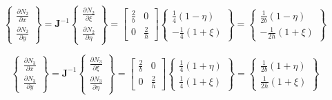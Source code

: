     \begin{equation}
        \begin{Bmatrix}
            \frac{\partial N_2}{\partial x} \\
            \frac{\partial N_2}{\partial y}
        \end{Bmatrix} = 
        \mathbf{J}^{-1}
        \begin{Bmatrix}
            \frac{\partial N_2}{\partial \xi} \\
            \frac{\partial N_2}{\partial \eta}
        \end{Bmatrix}=
        \begin{bmatrix}
                \frac{2}{b} &  0\\
                0 &  \frac{2}{h}
        \end{bmatrix}
        \begin{Bmatrix}
            \frac{1}{4}\left(1-\eta\right) \\
            -\frac{1}{4}\left(1+\xi\right)
        \end{Bmatrix}=
        \begin{Bmatrix}
            \frac{1}{2b}\left(1-\eta\right) \\
            -\frac{1}{2h}\left(1+\xi\right)
        \end{Bmatrix}
    \end{equation}

    \begin{equation}
        \begin{Bmatrix}
            \frac{\partial N_3}{\partial x} \\
            \frac{\partial N_3}{\partial y}
        \end{Bmatrix} = 
        \mathbf{J}^{-1}
        \begin{Bmatrix}
            \frac{\partial N_3}{\partial \xi} \\
            \frac{\partial N_3}{\partial \eta}
        \end{Bmatrix}=
        \begin{bmatrix}
                \frac{2}{b} &  0\\
                0 &  \frac{2}{h}
        \end{bmatrix}
        \begin{Bmatrix}
            \frac{1}{4}\left(1+\eta\right) \\
            \frac{1}{4}\left(1+\xi\right)
        \end{Bmatrix}=
        \begin{Bmatrix}
            \frac{1}{2b}\left(1+\eta\right) \\
            \frac{1}{2h}\left(1+\xi\right)
        \end{Bmatrix}
    \end{equation}

